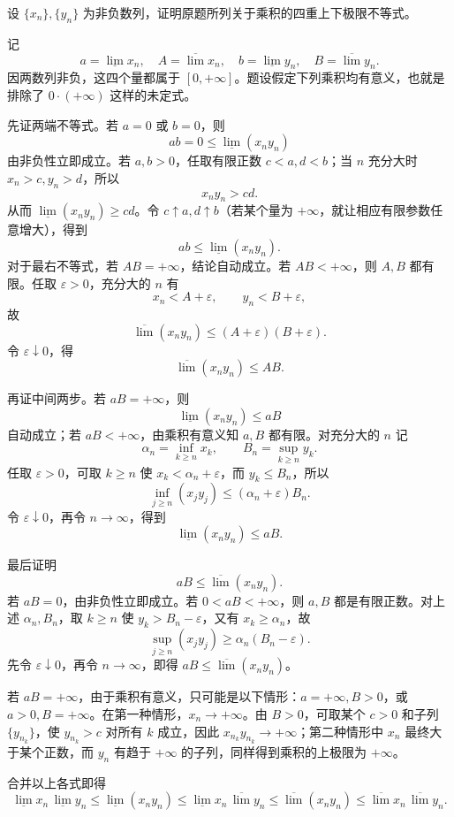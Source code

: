 \begin{xreferenceproblem}[第一组参考题 6]
设 $\{x_n\},\{y_n\}$ 为非负数列，证明原题所列关于乘积的四重上下极限不等式。
\end{xreferenceproblem}
\begin{xsolution}
记
\[
  a=\underline{\lim}x_n,
  \quad A=\overline{\lim}x_n,
  \quad b=\underline{\lim}y_n,
  \quad B=\overline{\lim}y_n.
\]
因两数列非负，这四个量都属于 $[0,+\infty]$。题设假定下列乘积均有意义，也就是排除了 $0\cdot(+\infty)$ 这样的未定式。

先证两端不等式。若 $a=0$ 或 $b=0$，则
\[
  ab=0\leqslant\underline{\lim}(x_ny_n)
\]
由非负性立即成立。若 $a,b>0$，任取有限正数 $c<a,d<b$；当 $n$ 充分大时 $x_n>c,y_n>d$，所以
\[
  x_ny_n>cd.
\]
从而 $\underline{\lim}(x_ny_n)\geqslant cd$。令 $c\uparrow a,d\uparrow b$（若某个量为 $+\infty$，就让相应有限参数任意增大），得到
\[
  ab\leqslant\underline{\lim}(x_ny_n).
\]
对于最右不等式，若 $AB=+\infty$，结论自动成立。若 $AB<+\infty$，则 $A,B$ 都有限。任取 $\varepsilon>0$，充分大的 $n$ 有
\[
  x_n<A+\varepsilon,
  \qquad
  y_n<B+\varepsilon,
\]
故
\[
  \overline{\lim}(x_ny_n)
  \leqslant(A+\varepsilon)(B+\varepsilon).
\]
令 $\varepsilon\downarrow0$，得
\[
  \overline{\lim}(x_ny_n)\leqslant AB.
\]

再证中间两步。若 $aB=+\infty$，则
\[
  \underline{\lim}(x_ny_n)\leqslant aB
\]
自动成立；若 $aB<+\infty$，由乘积有意义知 $a,B$ 都有限。对充分大的 $n$ 记
\[
  \alpha_n=\inf_{k\geqslant n}x_k,
  \qquad
  B_n=\sup_{k\geqslant n}y_k.
\]
任取 $\varepsilon>0$，可取 $k\geqslant n$ 使 $x_k<\alpha_n+\varepsilon$，而 $y_k\leqslant B_n$，所以
\[
  \inf_{j\geqslant n}(x_jy_j)
  \leqslant(\alpha_n+\varepsilon)B_n.
\]
令 $\varepsilon\downarrow0$，再令 $n\to\infty$，得到
\[
  \underline{\lim}(x_ny_n)\leqslant aB.
\]

最后证明
\[
  aB\leqslant\overline{\lim}(x_ny_n).
\]
若 $aB=0$，由非负性立即成立。若 $0<aB<+\infty$，则 $a,B$ 都是有限正数。对上述 $\alpha_n,B_n$，取 $k\geqslant n$ 使 $y_k>B_n-\varepsilon$，又有 $x_k\geqslant\alpha_n$，故
\[
  \sup_{j\geqslant n}(x_jy_j)
  \geqslant\alpha_n(B_n-\varepsilon).
\]
先令 $\varepsilon\downarrow0$，再令 $n\to\infty$，即得 $aB\leqslant\overline{\lim}(x_ny_n)$。

若 $aB=+\infty$，由于乘积有意义，只可能是以下情形：$a=+\infty,B>0$，或 $a>0,B=+\infty$。在第一种情形，$x_n\to+\infty$。由 $B>0$，可取某个 $c>0$ 和子列 $\{y_{n_k}\}$，使 $y_{n_k}>c$ 对所有 $k$ 成立，因此 $x_{n_k}y_{n_k}\to+\infty$；第二种情形中 $x_n$ 最终大于某个正数，而 $y_n$ 有趋于 $+\infty$ 的子列，同样得到乘积的上极限为 $+\infty$。

合并以上各式即得
\[
  \underline{\lim}x_n\,\underline{\lim}y_n
  \leqslant\underline{\lim}(x_ny_n)
  \leqslant\underline{\lim}x_n\,\overline{\lim}y_n
  \leqslant\overline{\lim}(x_ny_n)
  \leqslant\overline{\lim}x_n\,\overline{\lim}y_n.
\]
\end{xsolution}

